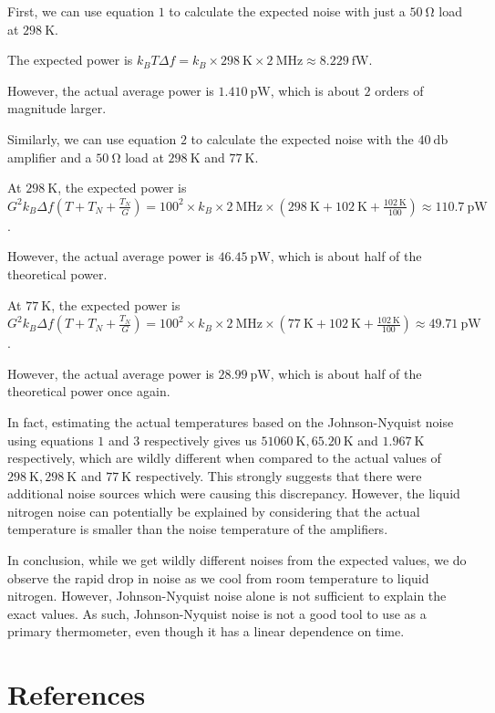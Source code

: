 \documentclass[english,12pt,a4paper]{article}
\begin{document}
First, we can use equation $1$ to calculate the expected noise with just a $\qty{50}{\ohm}$ load at $\qty{298}{\kelvin}$.

The expected power is $k_B T\Delta f = k_B \times \qty{298}{\kelvin} \times \qty{2}{\mega\hertz} \approx \qty{8.229}{\femto\watt}$.

However, the actual average power is $\qty{1.410}{\pico\watt}$, which is about $2$ orders of magnitude larger.

Similarly, we can use equation $2$ to calculate the expected noise with the $\qty{40}{\decibel}$ amplifier and a $\qty{50}{\ohm}$ load at $\qty{298}{\kelvin}$ and $\qty{77}{\kelvin}$.

At $\qty{298}{\kelvin}$, the expected power is $G^2k_B\Delta f\left(T+T_{N} + \frac {T_N}G \right) = 100^2\times k_B \times \qty{2}{\mega\hertz}\times \left(\qty{298}{\kelvin} +\qty{102}{\kelvin}  + \frac{\qty{102}{\kelvin}}{100}\right) \approx \qty{110.7}{\pico\watt}$.

However, the actual average power is $\qty{46.45}{\pico\watt}$, which is about half of the theoretical power.

At $\qty{77}{\kelvin}$, the expected power is $G^2k_B\Delta f\left(T+T_{N} + \frac {T_N}G \right) = 100^2\times k_B \times \qty{2}{\mega\hertz}\times \left(\qty{77}{\kelvin} +\qty{102}{\kelvin}  + \frac{\qty{102}{\kelvin}}{100}\right) \approx \qty{49.71}{\pico\watt}$.

However, the actual average power is $\qty{28.99}{\pico\watt}$, which is about half of the theoretical power once again.

In fact, estimating the actual temperatures based on the Johnson-Nyquist noise using equations $1$ and $3$ respectively gives us $\qty{51060}{\kelvin}, \qty{65.20}{\kelvin}$ and $\qty{1.967}{\kelvin}$ respectively, which are wildly different when compared to the actual values of $\qty{298}{\kelvin}, \qty{298}{\kelvin}$ and $\qty{77}{\kelvin}$ respectively. This strongly suggests that there were additional noise sources which were causing this discrepancy. However, the liquid nitrogen noise can potentially be explained by considering that the actual temperature is smaller than the noise temperature of the amplifiers.

In conclusion, while we get wildly different noises from the expected values, we do observe the rapid drop in noise as we cool from room temperature to liquid nitrogen. However, Johnson-Nyquist noise alone is not sufficient to explain the exact values. As such, Johnson-Nyquist noise is not a good tool to use as a primary thermometer, even though it has a linear dependence on time.

\newpage
\section{References}
\printbibliography
\end{document}
